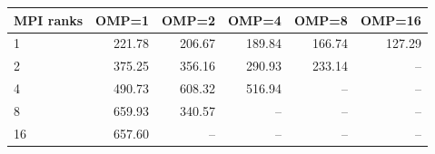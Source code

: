 \begin{tabular}{@{}lrrrrr@{}}
\toprule
MPI ranks & OMP=1 & OMP=2 & OMP=4 & OMP=8 & OMP=16 \\
\midrule
1 & 221.78 & 206.67 & 189.84 & 166.74 & 127.29 \\
2 & 375.25 & 356.16 & 290.93 & 233.14 & -- \\
4 & 490.73 & 608.32 & 516.94 & -- & -- \\
8 & 659.93 & 340.57 & -- & -- & -- \\
16 & 657.60 & -- & -- & -- & -- \\
\bottomrule
\end{tabular}
